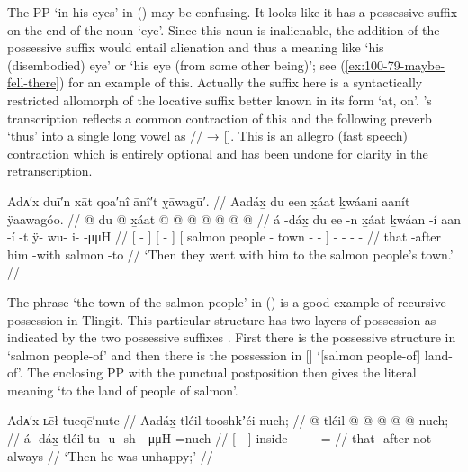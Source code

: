 The PP  ‘in his eyes’ in (\lastx) may be confusing.
It looks like it has a possessive suffix  on the end of the noun  ‘eye’.
Since this noun is inalienable, the addition of the possessive suffix would entail alienation and thus a meaning like ‘his (disembodied) eye’ or ‘his eye (from some other being)’; see (\ref{ex:100-79-maybe-fell-there}) for an example of this.
Actually the  suffix here is a syntactically restricted allomorph of the locative suffix better known in its form  ‘at, on’.
\citeauthor{swanton:1909}’s transcription  reflects a common contraction of this  and the following preverb  ‘thus’ into a single long vowel as // → [].
This is an allegro (fast speech) contraction which is entirely optional and has been undone for clarity in the retranscription.

\ex\label{ex:100-41-salmon-people-rescue}%
%
\begingl
	\glpreamble	Adᴀ′x duī′n xāt qoa′nî ānî′t ỵāwagū′. //
	\glpreamble	Aadáx̱ du een x̱áat ḵwáani aanít ÿaawagóo. //
	\gla	{}  @ {} {}
		{} du  @ {} {}
		{} x̱áat  @ {}  @ {} @ {} {}
		 @ {} @ {} @ {} @ {} //
	\glb	{} á -dáx̱ {}
		{} du ee -n {}
		{} x̱áat ḵwáan -í aan -í -t {}
		ÿ- wu- i-  -μμH //
	\glc	{}[  - {}]
		{}[   - {}]
		{}[ salmon people - town - - {}]
		- - -  - //
	\gld	{} that -after {}
		{} him {} -with {}
		{} salmon  {}  {} -to {}
		 {} {} {} {} //
	\glft	‘Then they went with him to the salmon people’s town.’
		//
\endgl
\xe

The phrase  ‘the town of the salmon people’ in (\lastx) is a good example of recursive possession in Tlingit.
This particular structure has two layers of possession as indicated by the two possessive suffixes .
First there is the possessive structure in  ‘salmon people-of’ and then there is the possession in []  ‘[salmon people-of] land-of’.
The enclosing PP with the punctual postposition  then gives the literal meaning ‘to the land of people of salmon’.

\ex\label{ex:100-42-unhappy}%
%
\begingl
	\glpreamble	Adᴀ′x ʟēł tucqē′nutc //
	\glpreamble	Aadáx̱ tléil tooshkʼéi nuch; //
	\gla	{}  @ {} {} 
		tléil  @ {} @ {} @ {} @ {} @ \•nuch; //
	\glb	{} á -dáx̱ {} 
		tléil tu- u- sh-  -μμH =nuch //
	\glc	{}[  - {}]
		 inside- - -  - = //
	\gld	{} that -after {}
		not  {} {} {} {} \•always //
	\glft	‘Then he was unhappy;’
		//
\endgl
\xe

